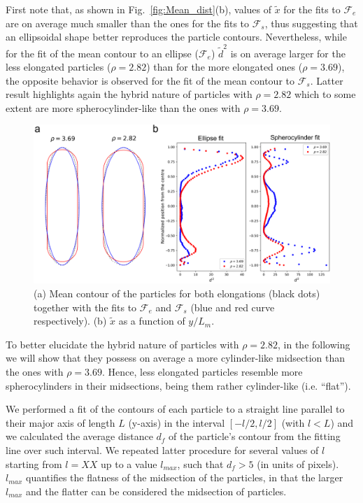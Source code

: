 \documentclass[aip,graphicx]{revtex4-1} %
\begin{document}
First note that, as shown in Fig.~\ref{fig:Mean_dist}(b), values of $\widetilde{x}$ for the fits to $\mathcal{F}_e$ 
are on average much smaller than the ones for the fits to $\mathcal{F}_s$, thus suggesting that an ellipsoidal shape better reproduces
the particle contours. Nevertheless, while for the fit of the mean contour to an ellipse ($\mathcal{F}_e$) $\widetilde{d}^2$ 
is on average larger for the less elongated particles ($\rho=2.82$) than for the more elongated ones ($\rho=3.69$), 
the opposite behavior is observed for the fit of the mean contour
to $\mathcal{F}_s$. Latter result highlights again the hybrid nature of particles with $\rho=2.82$ which to some extent are more
spherocylinder-like than the ones with $\rho=3.69$.

\begin{figure}
    \centering
    \includegraphics[width=0.7\columnwidth]{Mean_bord.png}
\caption{(a) Mean contour of the particles for both elongations (black dots) together with the fits to $\mathcal{F}_e$ and 
$\mathcal{F}_s$ (blue and red curve respectively). (b) $\widetilde{x}$ as a function of $y/L_m$.}\label{fig:Mean_bord}
\end{figure}

To better elucidate the hybrid nature of particles with $\rho=2.82$, in the following we will show that they
possess on average a more cylinder-like midsection than the ones with $\rho=3.69$. 
Hence, less elongated particles resemble more spherocylinders in their midsections, being them rather cylinder-like (i.e. ``flat'').

We performed a fit of the contours of each particle to a straight line parallel to their major axis of length $L$ (y-axis)
in the interval $[-l/2, l/2]$ (with $l < L$) and we calculated the average distance $d_f$ of
the particle's contour from the fitting line over such interval. 
We repeated latter procedure for several values of $l$ starting from $l=XX$ up to a value $l_{max}$, such that
$d_f > 5$ (in units of pixels). $l_{max}$ quantifies the flatness of the midsection of the particles, in that 
the larger $l_{max}$ and the flatter can be considered the midsection of particles.
\end{document}
